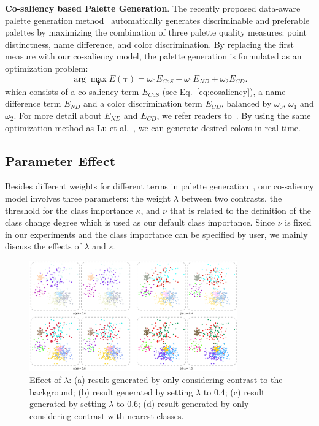 \vspace{1.5mm}
\noindent\textbf{Co-saliency based Palette Generation}.
The recently proposed data-aware palette generation method~\cite{Lu21} automatically generates discriminable and preferable palettes by maximizing the combination of three palette quality measures: point distinctness, name difference, and color discrimination.
By replacing the first measure with our co-saliency model, the palette generation is formulated as an optimization problem:
\begin{equation}
\arg\max_{\mathbf{\tau}} E(\mathbf{\tau}) = \omega_0 E_{CoS} + \omega_1 E_{ND} + \omega_2 E_{CD}.
\label{eq:energyfunc}
\end{equation}
which consists of a co-saliency term $E_{CoS}$ (see Eq.~\ref{eq:cosaliency}), a name difference term $E_{ND}$ and a color discrimination term $E_{CD}$, balanced by $\omega_0$, $\omega_1$ and $\omega_2$. For more detail about $E_{ND}$ and $E_{CD}$, we refer readers to~\cite{Lu21}. By using the same optimization method as Lu et al.~\cite{Lu21}, we can generate desired colors in real time. %



\subsection{Parameter Effect}
\label{subsec:parameter}
Besides different weights for different terms in palette generation~\cite{Lu21}, our co-saliency model involves three parameters: the weight $\lambda$ between two contrasts, the threshold for the class importance $\kappa$, and $\nu$ that is related to the definition of the class change degree which is used as our default class importance.
Since $\nu$ is fixed in our experiments and the class importance can be specified by user, we mainly discuss the effects of $\lambda$  and $\kappa$.

\begin{figure}[h]
\centering
\includegraphics[width=0.8\textwidth]{figures/lambda.pdf}
\caption{Effect of $\lambda$: (a) result generated by only considering contrast to the background; (b) result generated by setting $\lambda$ to 0.4; (c) result generated by setting $\lambda$ to 0.6; (d) result generated by only considering contrast with nearest classes.}
\vspace*{-3mm}
\label{fig:lambda}
\end{figure}

